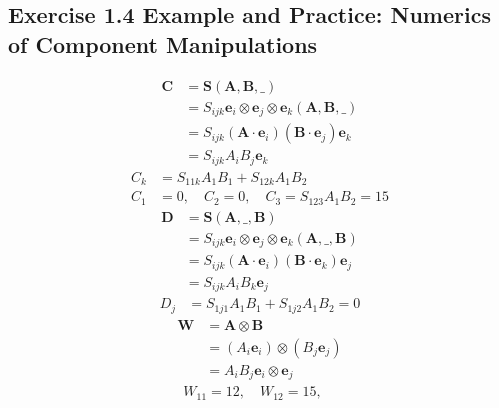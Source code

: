 \documentclass[../main.tex]{subfiles}
\begin{document}
\subsection{Exercise 1.4 Example and Practice: Numerics of Component Manipulations}
\begin{align}
    \mathbf{C}
    &=\mathbf{S}(\mathbf{A},\mathbf{B},\_)\\
    &=S_{ijk}\mathbf{e}_i\otimes\mathbf{e}_j\otimes\mathbf{e}_k(\mathbf{A},\mathbf{B},\_)\\
    &=S_{ijk}(\mathbf{A}\cdot\mathbf{e}_i)(\mathbf{B}\cdot\mathbf{e}_j)\mathbf{e}_k\\
    &=S_{ijk}A_iB_j\mathbf{e}_k
\end{align}
\begin{align}
    C_k&=S_{11k}A_1B_1+S_{12k}A_1B_2\\
    C_1&=0,\quad C_2=0,\quad C_3=S_{123}A_1B_2=15
\end{align}
\begin{align}
    \mathbf{D}
    &=\mathbf{S}(\mathbf{A},\_,\mathbf{B})\\
    &=S_{ijk}\mathbf{e}_i\otimes\mathbf{e}_j\otimes\mathbf{e}_k(\mathbf{A},\_,\mathbf{B})\\
    &=S_{ijk}(\mathbf{A}\cdot\mathbf{e}_i)(\mathbf{B}\cdot\mathbf{e}_k)\mathbf{e}_j\\
    &=S_{ijk}A_iB_k\mathbf{e}_j
\end{align}
\begin{align}
    D_j&=S_{1j1}A_1B_1 + S_{1j2}A_1B_2=0
\end{align}
\begin{align}
    \mathbf{W}
    &=\mathbf{A}\otimes\mathbf{B}\\
    &=(A_i\mathbf{e}_i)\otimes(B_j\mathbf{e}_j)\\
    &=A_iB_j \mathbf{e}_i\otimes\mathbf{e}_j
\end{align}
\begin{align}
    W_{11}=12,\quad W_{12}=15,\quad 
\end{align}
\end{document}
